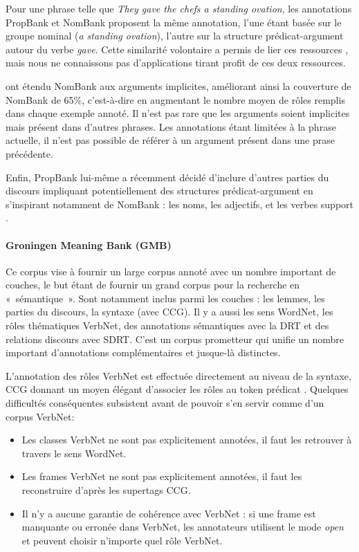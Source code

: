 Pour une phrase telle que \textit{They gave the chefs a standing ovation}, les
annotations PropBank et NomBank proposent la même annotation, l'une étant basée
sur le groupe nominal (\textit{a standing ovation}), l'autre sur la structure
prédicat-argument autour du verbe \textit{gave}. Cette similarité volontaire a
permis de lier ces ressources
\citep{pustejovsky2005merging,verhagen2007combining}, mais nous ne connaissons
pas d'applications tirant profit de ces deux ressources.

\cite{gerber2010beyond} ont étendu NomBank aux arguments
implicites, améliorant ainsi la couverture de NomBank de 65\%, c'est-à-dire en
augmentant le nombre moyen de rôles remplis dans chaque exemple annoté. Il
n'est pas rare que les arguments soient implicites mais présent dans d'autres
phrases. Les annotations étant limitées à la phrase actuelle, il n'est pas
possible de référer à un argument présent dans une prase précédente.

Enfin, PropBank lui-même a récemment décidé d'inclure d'autres parties du
discours impliquant potentiellement des structures prédicat-argument en
s'inspirant notamment de NomBank : les noms, les adjectifs, et les verbes
support \citep{bonial2014propbank}.


\paragraph{Groningen Meaning Bank (GMB)}

Ce corpus \citep{basile2014developing} vise à fournir un large corpus annoté
avec un nombre important de couches, le but étant de fournir un grand corpus
pour la recherche en «~sémantique~». Sont notamment inclus parmi les couches :
les lemmes, les parties du discours, la syntaxe (avec CCG). Il y a aussi les
sens WordNet, les rôles thématiques VerbNet, des annotations sémantiques avec
la DRT et des relations discours avec SDRT. C'est un corpus prometteur qui
unifie un nombre important d'annotations complémentaires et jusque-là
distinctes.

L'annotation des rôles VerbNet est effectuée directement au niveau de la
syntaxe, CCG donnant un moyen élégant d'associer les rôles au token prédicat
\citep{bos2012annotating}. Quelques difficultés conséquentes subsistent avant
de pouvoir s'en servir comme d'un corpus VerbNet:

\begin{itemize}
    \item Les classes VerbNet ne sont pas explicitement annotées, il faut les
        retrouver à travers le sens WordNet.
    \item Les frames VerbNet ne sont pas explicitement annotées, il faut les
        reconstruire d'après les supertags CCG.
    \item Il n'y a aucune garantie de cohérence avec VerbNet : si une frame est
        manquante ou erronée dans VerbNet, les annotateurs utilisent le mode
        \textit{open} et peuvent choisir n'importe quel rôle VerbNet.
\end{itemize}

